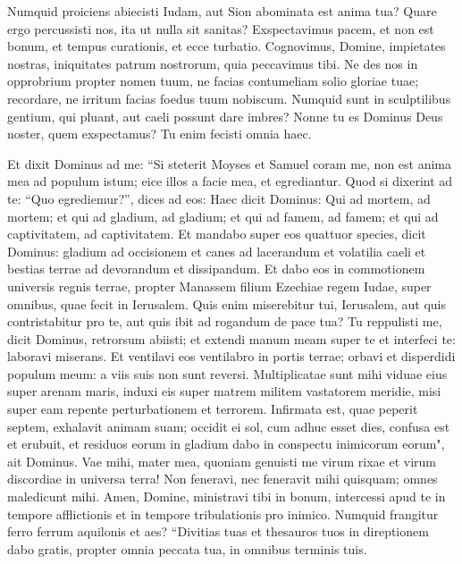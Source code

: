 \begin{biblechapter}
\verse Numquid proiciens abiecisti Iudam, aut Sion abominata est anima tua? Quare ergo percussisti nos, ita ut nulla sit sanitas? Exspectavimus pacem, et non est bonum, et tempus curationis, et ecce turbatio. 
\verse Cognovimus, Domine, impietates nostras, iniquitates patrum nostrorum, quia peccavimus tibi. 
\verse Ne des nos in opprobrium propter nomen tuum, ne facias contumeliam solio gloriae tuae; recordare, ne irritum facias foedus tuum nobiscum. 
\verse Numquid sunt in sculptilibus gentium, qui pluant, aut caeli possunt dare imbres? Nonne tu es Dominus Deus noster, quem exspectamus? Tu enim fecisti omnia haec. 
\end{biblechapter}

\begin{biblechapter}  
\verse Et dixit Dominus ad me: “Si steterit Moyses et Samuel coram me, non est anima mea ad populum istum; eice illos a facie mea, et egrediantur. 
\verse Quod si dixerint ad te: “Quo egrediemur?”, dices ad eos: Haec dicit Dominus: Qui ad mortem, ad mortem; et qui ad gladium, ad gladium; et qui ad famem, ad famem; et qui ad captivitatem, ad captivitatem. 
\verse Et mandabo super eos quattuor species, dicit Dominus: gladium ad occisionem et canes ad lacerandum et volatilia caeli et bestias terrae ad devorandum et dissipandum. 
\verse Et dabo eos in commotionem universis regnis terrae, propter Manassem filium Ezechiae regem Iudae, super omnibus, quae fecit in Ierusalem. 
\verse Quis enim miserebitur tui, Ierusalem, aut quis contristabitur pro te, aut quis ibit ad rogandum de pace tua? 
\verse Tu reppulisti me, dicit Dominus, retrorsum abiisti; et extendi manum meam super te et interfeci te: laboravi miserans. 
\verse Et ventilavi eos ventilabro in portis terrae; orbavi et disperdidi populum meum: a viis suis non sunt reversi. 
\verse Multiplicatae sunt mihi viduae eius super arenam maris, induxi eis super matrem militem vastatorem meridie, misi super eam repente perturbationem et terrorem. 
\verse Infirmata est, quae peperit septem, exhalavit animam suam; occidit ei sol, cum adhuc esset dies, confusa est et erubuit, et residuos eorum in gladium dabo in conspectu inimicorum eorum", ait Dominus. 
\verse Vae mihi, mater mea, quoniam genuisti me virum rixae et virum discordiae in universa terra! Non feneravi, nec feneravit mihi quisquam; omnes maledicunt mihi. 
\verse Amen, Domine, ministravi tibi in bonum, intercessi apud te in tempore afflictionis et in tempore tribulationis pro inimico. 
\verse Numquid frangitur ferro ferrum aquilonis et aes? 
\verse “Divitias tuas et thesauros tuos in direptionem dabo gratis, propter omnia peccata tua, in omnibus terminis tuis. 

\end{biblechapter}
